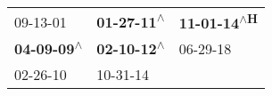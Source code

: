 \begin{supertabular}{lll}
                  09-13-01\textsuperscript{} &  \textbf{01-27-11\textsuperscript{$\wedge$}} &  \textbf{11-01-14\textsuperscript{$\wedge$H}} \\
 \textbf{04-09-09\textsuperscript{$\wedge$}} &  \textbf{02-10-12\textsuperscript{$\wedge$}} &                    06-29-18\textsuperscript{} \\
                  02-26-10\textsuperscript{} &                   10-31-14\textsuperscript{} &                                               \\
\end{supertabular}
